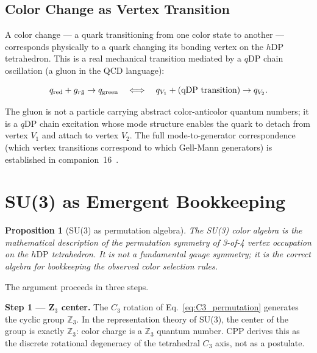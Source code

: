 \documentclass[12pt]{article}
\newtheorem{proposition}[theorem]{Proposition}
\newcommand{\qDP}{q\mathrm{DP}}
\newcommand{\hDP}{h\mathrm{DP}}
\begin{document}
\subsection{Color Change as Vertex Transition}

A color change --- a quark transitioning from one color state to
another --- corresponds physically to a quark changing its bonding
vertex on the $\hDP$ tetrahedron.  This is a real mechanical
transition mediated by a $\qDP$ chain oscillation (a gluon in the
QCD language):

\begin{equation}
q_{\rm red} + g_{r\bar{g}} \to q_{\rm green}
\quad \Longleftrightarrow \quad
q_{V_1} + \text{(qDP transition)} \to q_{V_2}.
\label{eq:color_change}
\end{equation}

The gluon is not a particle carrying abstract color-anticolor quantum
numbers; it is a $\qDP$ chain excitation whose mode structure enables
the quark to detach from vertex $V_1$ and attach to vertex $V_2$.
The full mode-to-generator correspondence (which vertex transitions
correspond to which Gell-Mann generators) is established in
companion~16~\cite{c16}.

\section{SU(3) as Emergent Bookkeeping}
\label{sec:su3}

\begin{proposition}[SU(3) as permutation algebra]
\label{prop:su3_bookkeeping}
The SU(3) color algebra is the mathematical description of the
permutation symmetry of 3-of-4 vertex occupation on the $\hDP$
tetrahedron.  It is not a fundamental gauge symmetry; it is the
correct algebra for bookkeeping the observed color selection rules.
\end{proposition}

The argument proceeds in three steps.

\textbf{Step 1 — Z$_3$ center.}
The $C_3$ rotation of Eq.~\eqref{eq:C3_permutation} generates the
cyclic group $\mathbb{Z}_3$.  In the representation theory of SU(3),
the center of the group is exactly $\mathbb{Z}_3$: color charge is a
$\mathbb{Z}_3$ quantum number.  CPP derives this as the discrete
rotational degeneracy of the tetrahedral $C_3$ axis, not as a
postulate.
\end{document}
